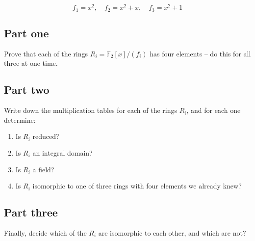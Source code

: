 \documentclass{amsart}[12pt]
\begin{document}
$$f_1=x^2,\quad f_2=x^2+x,\quad f_3=x^2+1$$ 

\subsection*{Part one} Prove that each of the rings $R_i=\mathbb{F}_2[x]/(f_i)$ has four elements -- do this for all three at one time.

\subsection*{Part two} Write down the multiplication tables for each of the rings $R_i$, and for each one determine:
\begin{enumerate}
\item Is $R_i$ reduced?  
\item Is $R_i$ an integral domain?
\item Is $R_i$ a field?
\item Is $R_i$ isomorphic to one of three rings with four elements we already knew?
 \end{enumerate} 
\subsection*{Part three}
Finally, decide which of the $R_i$ are isomorphic to each other, and which are not? 
\end{document}
